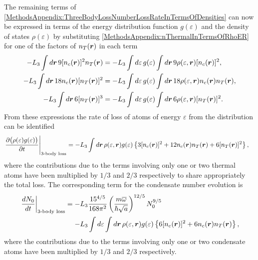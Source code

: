 The remaining terms of \eqref{MethodsAppendix:ThreeBodyLossNumberLossRateInTermsOfDensities} can now be expressed in terms of the energy distribution function $g(\varepsilon)$ and the density of states $\rho(\varepsilon)$ by substituting \eqref{MethodsAppendix:nThermalInTermsOfRhoER} for one of the factors of $n_T(\bm{r})$ in each term
\begin{align}
    -L_3 \int d \vect{r}\, 9 [n_c(\vect{r})]^2 n_T(\vect{r}) &= - L_3 \int d\varepsilon\, g(\varepsilon) \int d \vect{r}\, 9 \rho(\varepsilon, \vect{r}) [n_c(\vect{r})]^2, \label{MethodsAppendix:Condensate2Thermal1}\\
    -L_3 \int d \vect{r}\, 18 n_c(\vect{r}) [n_T(\vect{r})]^2 &= - L_3 \int d\varepsilon\, g(\varepsilon) \int d \vect{r}\, 18 \rho(\varepsilon, \vect{r}) n_c(\vect{r}) n_T(\vect{r}), \label{MethodsAppendix:Condensate1Thermal2}\\
    -L_3 \int d \vect{r}\, 6 [n_T(\vect{r})]^3 &= - L_3 \int d\varepsilon\, g(\varepsilon) \int d \vect{r}\, 6 \rho(\varepsilon, \vect{r}) [n_T(\vect{r})]^2. \label{MethodsAppendix:Condensate0Thermal3}
\end{align}
From these expressions the rate of loss of atoms of energy $\varepsilon$ from the distribution can be identified
\begin{align}
    \left.\frac{\partial\big(\rho(\varepsilon) g(\varepsilon)\big)}{\partial t}\right|_\text{3-body loss} &= -L_3 \int d \vect{r}\, \rho(\varepsilon, \vect{r}) g(\varepsilon) \left\{ 3 [n_c(\vect{r})]^2 + 12 n_c(\vect{r}) n_T(\vect{r}) + 6 [n_T(\vect{r})]^2 \right\},
    \label{MethodsAppendix:QKT3BodyLossDistributionEvolution}
\end{align}
where the contributions due to the terms involving only one or two thermal atoms have been multiplied by $1/3$ and $2/3$ respectively to share appropriately the total loss.  The corresponding term for the condensate number evolution is
\begin{align}
    \begin{split}
        \left. \frac{d N_0}{dt} \right|_\text{3-body loss} &= - L_3 \frac{15^{4/5}}{168 \pi^2} \left(\frac{m \overline{\omega}}{\hbar \sqrt{a}} \right)^{12/5} N_0^{9/5}\\
        &\relphantom{=} - L_3 \int d\varepsilon \int d \vect{r}\, \rho(\varepsilon, \vect{r}) g(\varepsilon) \left\{6 [n_c(\vect{r})]^2 + 6 n_c(\vect{r}) n_T(\vect{r}) \right\},
    \end{split}
    \label{MethodsAppendix:QKT3BodyLossCondensateEvolution}
\end{align}
where the contributions due to the terms involving only one or two condensate atoms have been multiplied by $1/3$ and $2/3$ respectively.

